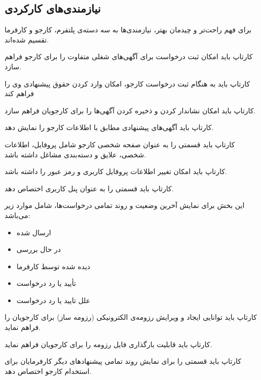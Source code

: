 \clearpage
\subsection{نیازمندی‌های کارکردی}
برای فهم راحت‌تر و چیدمان بهتر، نیازمندی‌ها به سه دسته‌ی پلتفرم، کارجو و کارفرما تقسیم شده‌اند.

\begin{enumerate}
	
	\addeditem
	کارتاپ باید امکان ثبت درخواست برای آگهی‌های شغلی متفاوت را برای کارجو فراهم سازد.
	
	\begin{enumerate}
		\subr 
		کارتاپ باید به هنگام ثبت درخواست کارجو، امکان وارد کردن حقوق پیشنهادی وی را فراهم کند
	\end{enumerate}
	
	\addeditem
	کارتاپ باید امکان نشاندار کردن و ذخیره کردن آگهی‌ها را برای کارجویان فراهم سازد.
	
	\addeditem
	کارتاپ باید آگهی‌های پیشنهادی مطابق با اطلاعات کارجو را نمایش دهد. 
	
	\addeditem
	کارتاپ باید قسمتی را به عنوان صفحه شخصی کارجو شامل پروفایل، اطلاعات شخصی، علایق و دسته‌بندی مشاغل داشته باشد.
	
	\addeditem
	کارتاپ باید امکان تغییر اطلاعات پروفایل کاربری و رمز عبور را داشته باشد.
	
	\addeditem
	کارتاپ باید قسمتی را به عنوان پنل کاربری اختصاص دهد.
	
	این بخش برای نمایش آخرین وضعیت و روند تمامی درخواست‌ها، شامل موارد زیر می‌باشد:
	
	\begin{itemize}
		\item
		ارسال شده
		\item
		در حال بررسی
		\item
		دیده شده توسط کارفرما
		\item
		تأیید یا رد درخواست
		\item
		علل تایید یا رد درخواست
	\end{itemize}
	
	\addeditem
	کارتاپ باید توانایی ایجاد و ویرایش رزومه‌ی الکترونیکی (رزومه ساز) برای کارجویان را فراهم نماید.
	
	\addeditem
	کارتاپ باید قابلیت بارگذاری فایل رزومه را برای کارجویان فراهم نماید. 
	
	\addeditem
	کارتاپ باید قسمتی را برای نمایش روند تمامی پیشنهادهای دیگر کارفرمایان برای استخدام کارجو اختصاص دهد. 
	

\end{enumerate}
